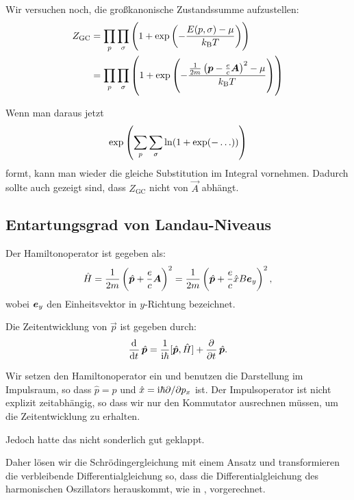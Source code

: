 Wir versuchen noch, die großkanonische Zustandssumme aufzustellen:
\begin{align*}
    Z_\text{GC}
    &= \prod_p \prod_\sigma \del{1 + \exp\del{- \frac{E(p, \sigma) - \mu}{\kB
    T}}} \\
    &= \prod_p \prod_\sigma \del{1 + \exp\del{- \frac{\frac1{2m} \del{\vec p -
\frac ec \vec A}^2- \mu}{\kB
    T}}}
\end{align*}

Wenn man daraus jetzt
\[
    \exp\del{\sum_p \sum_\sigma \ln(1 + \exp(-\ldots))}
\]
formt, kann man wieder die gleiche Substitution im Integral vornehmen. Dadurch
sollte auch gezeigt sind, dass $Z_\text{GC}$ nicht von $\vec A$ abhängt.

\subsection{Entartungsgrad von Landau-Niveaus}

Der Hamiltonoperator ist gegeben als:
\[
    \hat H = \frac1{2m} \del{\hat{\vec p} + \frac ec \vec A}^2
    = \frac1{2m} \del{\hat{\vec p} + \frac ec \hat x B \ev_y}^2,
\]
wobei $\boldsymbol{e}_y$ den Einheitsvektor in $y$-Richtung bezeichnet.

Die Zeitentwicklung von $\vec p$ ist gegeben durch:
\[
    \dod{}t \hat{\vec p} = \frac1{\iup\hbar} [\hat{\vec p}, \hat H] + \dpd{}t \hat{\vec p}.
\]

Wir setzen den Hamiltonoperator ein und benutzen die Darstellung im Impulsraum,
so dass $\hat p = p$ und $\hat x = \mathrm i\hbar \partial/\partial p_x$ ist. Der
Impulsoperator ist nicht explizit zeitabhängig, so dass wir nur den Kommutator
ausrechnen müssen, um die Zeitentwicklung zu erhalten.

Jedoch hatte das nicht sonderlich gut geklappt.

Daher lösen wir die Schrödingergleichung mit einem Ansatz und transformieren
die verbleibende Differentialgleichung so, dass die Differentialgleichung des
harmonischen Oszillators herauskommt, wie in
\cite[Abschnitt~3.2.7]{nolting-theo6}, vorgerechnet.

